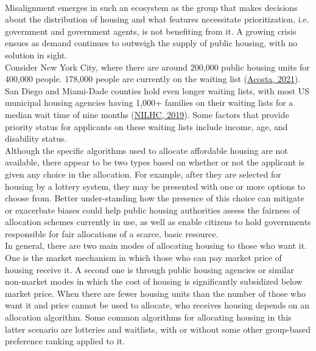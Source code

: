 \documentclass[11pt]{article}
\begin{document}
\\ Misalignment emerges in such an ecosystem as the group that makes decisions about the distribution of housing and what features necessitate prioritization, i.e. government and government agents, is not benefiting from it. A growing crisis ensues as demand continues to outweigh the supply of public housing, with no solution in sight. \\
\newline
Consider New York City, where there are around 200,000 public housing units for 400,000 people. 178,000 people are currently on the waiting list (\href{https://www.cbpp.org/research/housing/long-waitlists-for-housing-vouchers-show-pressing-unmet-need-for-assistance}{Acosta, 2021}). San Diego and Miami-Dade counties hold even longer waiting lists, with most US municipal housing agencies having 1,000+ families on their waiting lists for a median wait time of nine months (\href{https://nlihc.org/news/closed-waiting-lists-and-long-waits-await-those-seeking-affordable-housing-according-new-nlihc#:~:text=Public%20Housing%20provides%20homes%20for,average%20size%20of%20834%20households.}{NILHC, 2019}). Some factors that provide priority status for applicants on these waiting lists include income, age, and disability status. \\
\newline
Although the specific algorithms used to allocate affordable housing are not available, there appear to be two types based on whether or not the applicant is given any choice in the allocation. For example, after they are selected for housing by a lottery system, they may be presented with one or more options to choose from. Better under-standing how the presence of this choice can mitigate or exacerbate biases could help public housing authorities assess the fairness of allocation schemes currently in use, as well as enable citizens to hold governments responsible for fair allocations of a scarce, basic resource.\\
\newline
In general, there are two main modes of allocating housing to those who want it. One is the market mechanism in which those who can pay market price of housing receive it. A second one is through public housing agencies or similar non-market modes in which the cost of housing is significantly subsidized below market price. When there are fewer housing units than the number of those who want it and price cannot be used to allocate, who receives housing depends on an allocation algorithm. Some common algorithms for allocating housing in this latter scenario are lotteries and waitlists, with or without some other group-based preference ranking applied to it.\\
\end{document}
